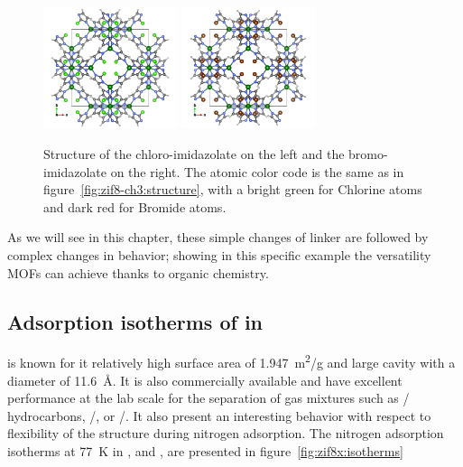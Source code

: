 \documentclass[thesis]{subfiles}
\begin{document}
\begin{figure}[ht]
    \centering
    \includegraphics[width=0.35\textwidth]{figures/images/ZIF8-Cl}
    \hspace{2em}
    \includegraphics[width=0.35\textwidth]{figures/images/ZIF8-Br}
    \caption{Structure of the chloro-imidazolate \ZIFCl on the left and the
    bromo-imidazolate \ZIFBr on the right. The atomic color code is the same
    as in figure~\ref{fig:zif8-ch3:structure}, with a bright green for Chlorine
    atoms and dark red for Bromide atoms.}
    \label{fig:zif8-x:structures}
\end{figure}

As we will see in this chapter, these simple changes of linker are followed by
complex changes in behavior; showing in this specific example the versatility
MOFs can achieve thanks to organic chemistry.

\FloatBarrier
\subsection{Adsorption isotherms of  in }

 is known for it relatively high surface area of \SI{1.947}{m^2/g} and
large cavity with a diameter of \SI{11.6}{\AA}\cite{Park2006}. It is also
commercially available and have excellent performance at the lab scale for the
separation of gas mixtures such as / hydrocarbons,
/, or /\cite{Li2009,Bux2011}. It also present an
interesting behavior with respect to flexibility of the structure during
nitrogen adsorption. The nitrogen adsorption isotherms at \SI{77}{K} in ,
\ZIFCl and \ZIFBr, are presented in figure~\ref{fig:zif8x:isotherms}
\end{document}
